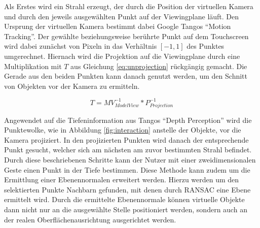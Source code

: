 Als Erstes wird ein Strahl erzeugt, der durch die Position der virtuellen Kamera und durch den jeweils ausgewählten Punkt auf der Viewingplane läuft. Den Ursprung der virtuellen Kamera bestimmt dabei Google Tangos \enquote{Motion Tracking}. Der gewählte beziehungsweise berührte Punkt auf dem Touchscreen wird dabei zunächst von Pixeln in das Verhältnis \(\left[-1,1\right]\) des Punktes umgerechnet. Hiernach wird die Projektion auf die Viewingplane durch eine Multiplikation mit \(T\) aus Gleichung \ref{eq:unprojection} rückgängig gemacht. Die Gerade aus den beiden Punkten kann danach genutzt werden, um den Schnitt von Objekten vor der Kamera zu ermitteln. \citep{OpenG86:online} 

\begin{equation} \label{eq:unprojection}
T  = MV_{ModelView}^{-1} * P_{Projection}^{-1}
\end{equation}

Angewendet auf die Tiefeninformation aus Tangos \enquote{Depth Perception} wird die Punktewolke, wie in Abbildung \ref{fig:interaction} anstelle der Objekte, vor die Kamera projiziert. In den projizierten Punkten wird danach der entsprechende Punkt gesucht, welcher sich am nächsten am zuvor bestimmten Strahl befindet. Durch diese beschriebenen Schritte kann der Nutzer mit einer zweidimensionalen Geste einen Punkt in der Tiefe bestimmen. Diese Methode kann zudem um die Ermittlung einer Ebenennormalen erweitert werden. Hierzu werden um den selektierten Punkte Nachbarn gefunden, mit denen durch RANSAC eine Ebene ermittelt wird. Durch die ermittelte Ebenennormale können virtuelle Objekte dann nicht nur an die ausgewählte Stelle positioniert werden, sondern auch an der realen Oberflächenausrichtung ausgerichtet werden.

